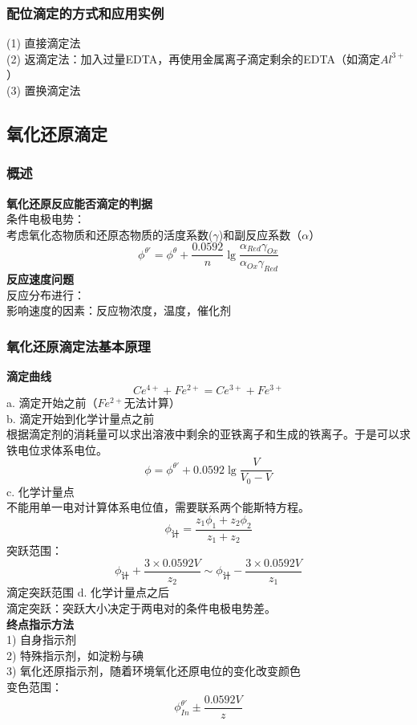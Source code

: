 \documentclass[utf8,a4paper,12pt]{ctexart}
\begin{document}
\subsubsection{配位滴定的方式和应用实例}
(1) 直接滴定法\\
(2) 返滴定法：加入过量EDTA，再使用金属离子滴定剩余的EDTA（如滴定$Al^{3+}$）\\
(3) 置换滴定法

\subsection{氧化还原滴定}
\subsubsection{概述}
{\bf 氧化还原反应能否滴定的判据}\\
条件电极电势：\\
考虑氧化态物质和还原态物质的活度系数($\gamma$)和副反应系数（$\alpha$）\\
\[\phi^{\theta'} = \phi^{\theta} + \frac{0.0592}{n}\lg\frac{\alpha_{Red}\gamma_{Ox}}{\alpha_{Ox}\gamma_{Red}}\]
{\bf 反应速度问题}\\
反应分布进行：\\
影响速度的因素：反应物浓度，温度，催化剂

\subsubsection{氧化还原滴定法基本原理}
{\bf 滴定曲线}
\[Ce^{4+} + Fe^{2+} = Ce^{3+} + Fe^{3+}\]
a. 滴定开始之前（$Fe^{2+}$无法计算）\\
b. 滴定开始到化学计量点之前\\
根据滴定剂的消耗量可以求出溶液中剩余的亚铁离子和生成的铁离子。于是可以求铁电位求体系电位。
\[\phi = \phi^{\theta'} + 0.0592\lg\frac{V}{V_0 - V}\]
c. 化学计量点\\
不能用单一电对计算体系电位值，需要联系两个能斯特方程。
\[\phi_{\text{计}} = \frac{z_1\phi_1 + z_2\phi_2}{z_1 + z_2}\]
突跃范围：
\[\phi_{\text{计}} + \frac{3\times 0.0592V}{z_2} \sim\phi_{\text{计}} - \frac{3\times 0.0592V}{z_1} \]
滴定突跃范围
d. 化学计量点之后\\
滴定突跃：突跃大小决定于两电对的条件电极电势差。\\
{\bf 终点指示方法}\\
1) 自身指示剂\\
2) 特殊指示剂，如淀粉与碘\\
3) 氧化还原指示剂，随着环境氧化还原电位的变化改变颜色\\
变色范围：
\[\phi_{In}^{\theta'} \pm \frac{0.0592V}{z}\]
\end{document}
